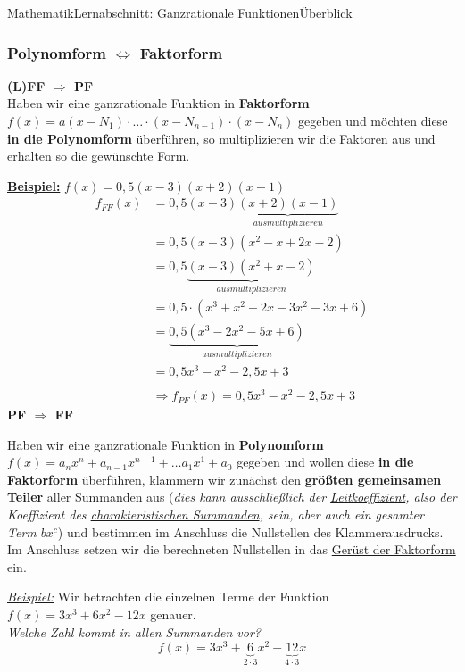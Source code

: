 \documentclass[11pt,twocolumn,oneside,openany,headings=optiontotoc,11pt,numbers=noenddot]{article}
\begin{document}
\begin{worksheet}{Mathematik}{Lernabschnitt: Ganzrationale Funktionen}{Überblick}
		\subsubsection*{Polynomform \(\Leftrightarrow\) Faktorform}
		\textbf{(L)FF \(\Rightarrow\) PF}\\
		Haben wir eine ganzrationale Funktion in \textbf{Faktorform} \(f(x) = a(x-N_1)\cdot\ldots\cdot(x-N_{n-1})\cdot(x-N_{n})\) gegeben und möchten diese \textbf{in die Polynomform} überführen, so multiplizieren wir die Faktoren aus und erhalten so die gewünschte Form.\\
		\par\noindent
		\underline{\textbf{Beispiel:}} \(f(x) = 0,5(x-3)(x+2)(x-1)\)
		\begin{align*}
			f_{FF}(x) & = 0,5(x-3)\underbrace{(x+2)(x-1)}_{ausmultiplizieren}\\
			& = 0,5(x-3)(x^2 - x +2x -2)\\
			& = 0,5\underbrace{(x-3)(x^2 + x -2)}_{ausmultiplizieren}\\
			& = 0,5\cdot(x^3 +x^2 -2x -3x^2 -3x +6)\\
			& = \underbrace{0,5(x^3 -2x^2 -5x +6)}_{ausmultiplizieren}\\
			& = 0,5x^3 - x^2 -2,5x +3\\
			\\
			& \Rightarrow f_{PF}(x) = 0,5x^3 -x^2 -2,5x + 3
		\end{align*}
		\textbf{PF \(\Rightarrow\) FF}\\
		\par\noindent
		Haben wir eine ganzrationale Funktion in \textbf{Polynomform} \(f(x) = a_nx^n + a_{n-1}x^{n-1} + \ldots a_1x^1 + a_0\) gegeben und wollen diese \textbf{in die Faktorform} überführen, klammern wir zunächst den \textbf{größten gemeinsamen Teiler} aller Summanden aus (\textit{dies kann ausschließlich der \underline{Leitkoeffizient}, also der Koeffizient des \underline{charakteristischen Summanden}, sein, aber auch ein gesamter Term \(bx^c\)}) und bestimmen im Anschluss die Nullstellen des Klammerausdrucks.\\
		Im Anschluss setzen wir die berechneten Nullstellen in das \underline{Gerüst der Faktorform} ein.\\
		\par\noindent
		\underline{\textit{Beispiel:}} Wir betrachten die einzelnen Terme der Funktion \(f(x) = 3x^3 + 6x^2 -12x\) genauer.\\
		\textit{Welche Zahl kommt in allen Summanden vor?}
		\[f(x) = 3x^3 + \underbrace{6}_{2\cdot{}3}x^2 - \underbrace{12}_{4\cdot{}3}x\]

\end{worksheet}
\end{document}
